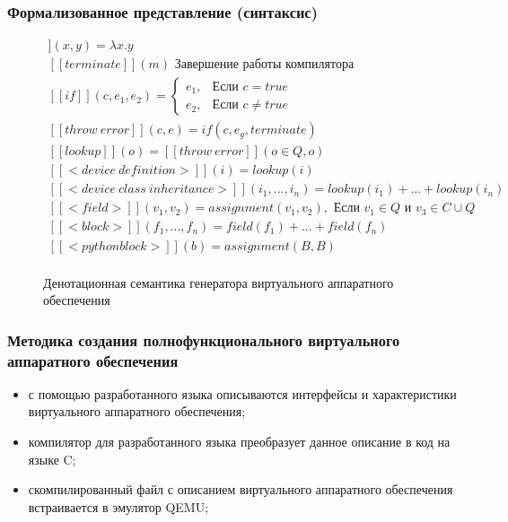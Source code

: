 \begin{frame}%
    \frametitle{Формализованное представление (синтаксис)}
    \begin{figure}[!htbp]
        \begin{adjustbox}{max totalsize={\textwidth}{\textheight}}
        \begin{minipage}{\linewidth}
                \centering
                \begingroup
                \begin{gather*}
                    [[assignment]](x,y) = \lambda x.y \\
                    [[terminate]](m) \text{ Завершение работы компилятора} \\
                    [[if]](c,e_1,e_2) =
                    \begin{cases}
                        e_1, & \text{Если } c = true \\
                        e_2, & \text{Если } c \not= true
                    \end{cases} \\
                    [[throw\ error]](c, e) = if(c, e_g, terminate) \\
                    [[lookup]](o) = [[throw\ error]](o \in Q, o) \\
                    [[<device\ definition>]](i) = lookup(i) \\
                    [[<device\ class\ inheritance>]](i_1,...,i_n) = lookup(i_1) + ... + lookup(i_n) \\
                    [[<field>]](v_1, v_2) = assignment(v_1, v_2), \text{ Если } v_1 \in Q \text{ и } v_3 \in C \cup Q \\
                    [[<block>]](f_1,...,f_n) = field(f_1) + ... + field(f_n) \\
                    [[<python block>]](b) = assignment(B,B)\\
                \end{gather*}
                \endgroup
            \end{minipage}
        \end{adjustbox}
        \caption{Денотационная семантика генератора виртуального аппаратного обеспечения}\label{fig:denotational-semantics}
    \end{figure}
\end{frame}%


\begin{frame}%
    \frametitle{Методика создания полнофункционального виртуального аппаратного обеспечения}
    \begin{itemize}
        \item с помощью разработанного языка описываются интерфейсы и характеристики виртуального аппаратного обеспечения;
        \item компилятор для разработанного языка преобразует данное описание в код на языке C;
        \item скомпилированный файл с описанием виртуального аппаратного обеспечения встраивается в эмулятор QEMU;
    \end{itemize}
\end{frame}


